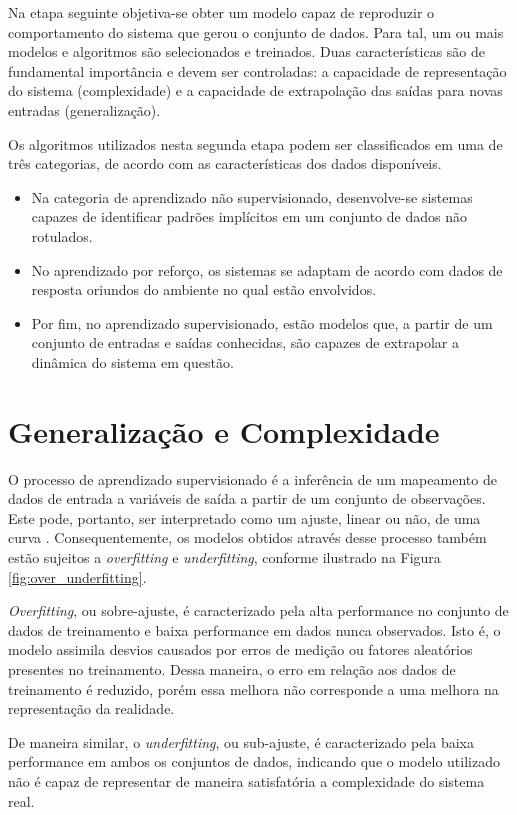 Na etapa seguinte objetiva-se obter um modelo capaz de reproduzir o comportamento do sistema que gerou o conjunto de dados. Para tal, um ou mais modelos e algoritmos são selecionados e treinados. Duas características são de fundamental importância e devem ser controladas: a capacidade de representação do sistema (complexidade) e a capacidade de extrapolação das saídas para novas entradas (generalização).

Os algoritmos utilizados nesta segunda etapa podem ser classificados em uma de três categorias, de acordo com as características dos dados disponíveis. \cite{ai_modern}
\begin{itemize}
    \item Na categoria de aprendizado não supervisionado, desenvolve-se sistemas capazes de identificar padrões implícitos em um conjunto de dados não rotulados.
    \item No aprendizado por reforço, os sistemas se adaptam de acordo com dados de resposta oriundos do ambiente no qual estão envolvidos.
    \item Por fim, no aprendizado supervisionado, estão modelos que, a partir de um conjunto de entradas e saídas conhecidas, são capazes de extrapolar a dinâmica do sistema em questão.
\end{itemize}

\section{Generalização e Complexidade}

O processo de aprendizado supervisionado é a inferência de um mapeamento de dados de entrada a variáveis de saída a partir de um conjunto de observações. Este pode, portanto, ser interpretado como um ajuste, linear ou não, de uma curva \cite{haykin}. Consequentemente, os modelos obtidos através desse processo também estão sujeitos a \textit{overfitting} e \textit{underfitting}, conforme ilustrado na Figura \ref{fig:over_underfitting}.

\textit{Overfitting}, ou sobre-ajuste, é caracterizado pela alta performance no conjunto de dados de treinamento e baixa performance em dados nunca observados. Isto é, o modelo assimila desvios causados por erros de medição ou fatores aleatórios presentes no treinamento. Dessa maneira, o erro em relação aos dados de treinamento é reduzido, porém essa melhora não corresponde a uma melhora na representação da realidade.

De maneira similar, o \textit{underfitting}, ou sub-ajuste, é caracterizado pela baixa performance em ambos os conjuntos de dados, indicando que o modelo utilizado não é capaz de representar de maneira satisfatória a complexidade do sistema real.

